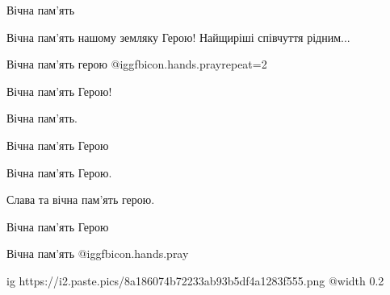 \begin{itemize}
Вічна пам'ять

Вічна пам'ять нашому земляку Герою! Найщиріші співчуття рідним...

Вічна пам'ять герою @igg{fbicon.hands.pray}{repeat=2} 

Вічна пам'ять Герою!

Вічна пам'ять.

Вічна пам'ять Герою

Вічна пам'ять Герою.

Слава та вічна пам'ять герою.

Вічна пам'ять Герою

Вічна пам'ять @igg{fbicon.hands.pray} 

\ifcmt
  ig https://i2.paste.pics/8a186074b72233ab93b5df4a1283f555.png
  @width 0.2
\fi

\end{itemize} %
